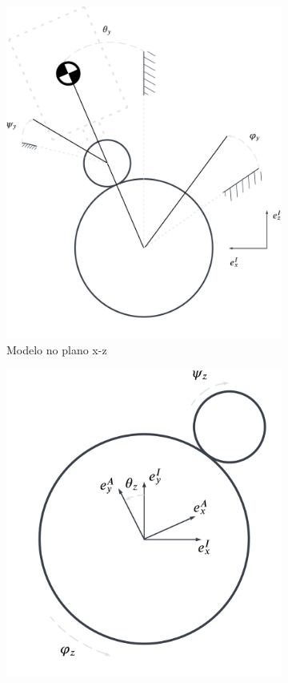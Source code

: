 \begin{figure}[H]
\begin{subfigure}[b]{0.4\textwidth}
        \includegraphics[width=\linewidth]{Metodologia/Figuras/modelo_plano_xz.png}
        \caption{Modelo no plano x-z}
        \label{fig:modelo_xz}
    \end{subfigure}
    \hfill
    \begin{subfigure}[b]{0.4\textwidth}
        \centering
        \includegraphics[width=\linewidth]{Metodologia/Figuras/modelo_plano_xy.png}

\end{subfigure}
\end{figure}
